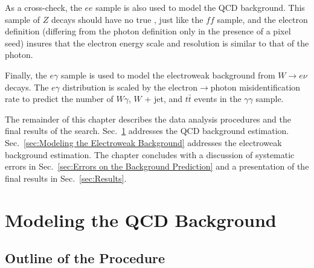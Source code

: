 \documentclass[dissertation_bw.tex]{subfiles}
\begin{document}

As a cross-check, the $ee$ sample is also used to model the QCD background.  This sample of $Z$ decays should have no true \MET, just like the $\mathit{ff}$ sample, and the electron definition (differing from the photon definition only in the presence of a pixel seed) insures that the electron energy scale and resolution is similar to that of the photon.

Finally, the $e\gamma$ sample is used to model the electroweak background from $W\rightarrow e\nu$ decays.  The $e\gamma$ \MET distribution is scaled by the electron$\rightarrow$photon misidentification rate to predict the number of $W\gamma$, $W$ + jet, and $t\bar{t}$ events in the $\gamma\gamma$ sample.

The remainder of this chapter describes the data analysis procedures and the final results of the search.  Sec.~\ref{sec:Modeling the QCD Background} addresses the QCD background estimation.  Sec.~\ref{sec:Modeling the Electroweak Background} addresses the electroweak background estimation.  The chapter concludes with a discussion of systematic errors in Sec.~\ref{sec:Errors on the Background Prediction} and a presentation of the final results in Sec.~\ref{sec:Results}.

\section{Modeling the QCD Background}
\label{sec:Modeling the QCD Background}

\subsection{Outline of the Procedure}
\label{sec:Outline of the Procedure}
\end{document}
